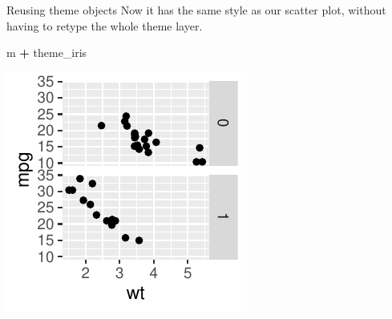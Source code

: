 \documentclass[
  ignorenonframetext,
]{beamer}
\newenvironment{Shaded}{\begin{snugshade}}{\end{snugshade}}
\newcommand{\NormalTok}[1]{#1}
\newcommand{\SpecialCharTok}[1]{\textcolor[rgb]{0.81,0.36,0.00}{\textbf{#1}}}
\begin{document}
\begin{frame}[fragile]{Reusing theme objects}
\label{reusing-theme-objects-3}
Now it has the same style as our scatter plot, without having to retype
the whole theme layer.

\begin{Shaded}
\begin{Highlighting}[]
\NormalTok{m }\SpecialCharTok{+}\NormalTok{ theme\_iris}
\end{Highlighting}
\end{Shaded}

\begin{center}\includegraphics[width=0.5\linewidth]{Figs/unnamed-chunk-79-1} \end{center}
\end{frame}
\end{document}
